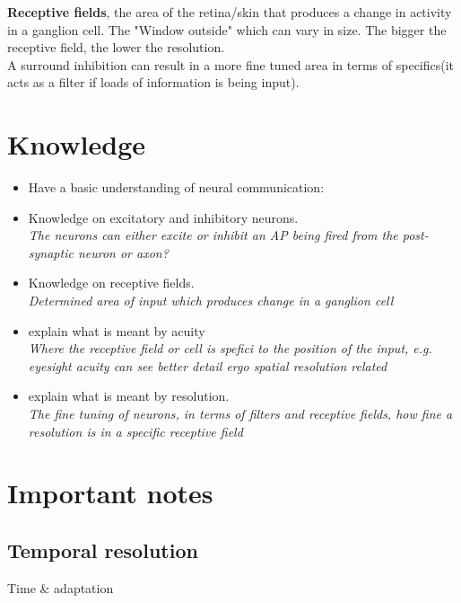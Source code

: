 \documentclass{article}
\begin{document}
\textbf{Receptive fields}, the area of the retina/skin that produces a change in activity in a ganglion cell. The "Window outside" which can vary in size. The bigger the receptive field, the lower the resolution.\\
A surround inhibition can result in a more fine tuned area in terms of specifics(it acts as a filter if loads of information is being input).\\

\section{Knowledge}
\begin{itemize}
  \item Have a basic understanding of neural communication:\\
  \item Knowledge on excitatory and inhibitory neurons.\\
    \textit{The neurons can either excite or inhibit an AP being fired from the post-synaptic neuron or axon?}\\
  \item Knowledge on receptive fields.\\
    \textit{Determined area of input which produces change in a ganglion cell}\\
  \item explain what is meant by acuity\\
    \textit{Where the receptive field or cell is spefici to the position of the input, e.g. eyesight acuity can see better detail ergo spatial resolution related}\\
  \item explain what is meant by resolution.\\
    \textit{The fine tuning of neurons, in terms of filters and receptive fields, how fine a resolution is in a specific receptive field}\\
\end{itemize}

\section{Important notes}
\subsection{Temporal resolution}
Time \& adaptation
\end{document}
